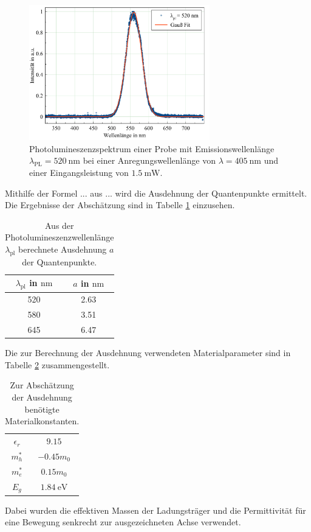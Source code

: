 \begin{figure}[H]
  \centering
  \includegraphics[width=0.7\textwidth]{plots/PL_520nm.png}
  \caption{Photolumineszenzspektrum einer Probe mit Emissionswellenlänge $\lambda_{\text{PL}}=\SI{520}{\nano\meter}$ bei einer Anregungswellenlänge von $\lambda=\SI{405}{\nano\meter}$ und einer Eingangsleistung von $\SI{1,5}{\milli\watt}$.}
  \label{fig:pl520}
\end{figure}

Mithilfe der Formel ... aus ... wird die Ausdehnung der Quantenpunkte ermittelt. Die Ergebnisse der Abschätzung sind in Tabelle \ref{tab:breiten} einzusehen.
\begin{table}[H]
  \centering
  \caption{Aus der Photolumineszenzwellenlänge $\lambda_{\text{pl}}$ berechnete Ausdehnung $a$ der Quantenpunkte.}
  \label{tab:breiten}
  \begin{tabular}{cc}
    \toprule
     $\lambda_{\text{pl}}$ in $\si{\nano\meter}$& $a$ in $\si{\nano\meter}$ \\
    \midrule
    520 & 2.63 \\
    580 & 3.51 \\
    645 & 6.47 \\
    \bottomrule
  \end{tabular}
\end{table}

Die zur Berechnung der Ausdehnung verwendeten Materialparameter sind in Tabelle \ref{tab:const} zusammengestellt.
\begin{table}[H]
  \centering
  \caption{Zur Abschätzung der Ausdehnung benötigte Materialkonstanten.}
  \label{tab:const}
  \begin{tabular}{c|c}
    \toprule
    $\epsilon_r $ & $ 9.15$ \\
    $m^*_h$ & $ -0.45 m_0$ \\
    $m^*_e $ & $ 0.15 m_0$ \\
    $E_g $ & $\SI{1.84}{\electronvolt}$ \\
    \bottomrule
  \end{tabular}
\end{table}
Dabei wurden die effektiven Massen der Ladungsträger und die Permittivität für eine Bewegung senkrecht zur ausgezeichneten Achse verwendet.

